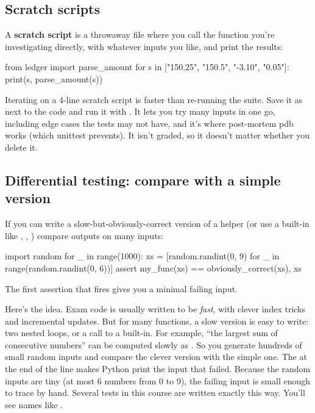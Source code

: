 \documentclass[10pt,a4paper]{article}
\begin{document}
\subsection{Scratch scripts}
A \textbf{scratch script} is a throwaway file where you call the function you’re investigating directly, with whatever inputs you like, and print the results:
\begin{pycode}
from ledger import parse_amount
for s in ["150.25", "150.5", "-3.10", "0.05"]:
    print(s, parse_amount(s))
\end{pycode}
Iterating on a 4-line scratch script is faster than re-running the suite.
Save it as  next to the code and run it with . It lets you try many inputs in one go, including edge cases the tests may not have, and it’s where post-mortem pdb works (which unittest prevents). It isn’t graded, so it doesn’t matter whether you delete it.
\subsection{Differential testing: compare with a simple version}
\begin{tipbox}
If you can write a slow-but-obviously-correct version of a helper (or use a built-in like , , ) compare outputs on many inputs:
\end{tipbox}
\begin{pycode}
import random
for _ in range(1000):
    xs = [random.randint(0, 9) for _ in range(random.randint(0, 6))]
    assert my_func(xs) == obviously_correct(xs), xs
\end{pycode}
\begin{keybox}
The first assertion that fires gives you a minimal failing input.
\end{keybox}
Here’s the idea. Exam code is usually written to be \emph{fast}, with clever index tricks and incremental updates. But for many functions, a slow version is easy to write: two nested loops, or a call to a built-in. For example, “the largest sum of  consecutive numbers” can be computed slowly as .
So you generate hundreds of small random inputs and compare the clever version with the simple one. The  at the end of the  line makes Python print the input that failed. Because the random inputs are tiny (at most 6 numbers from 0 to 9), the failing input is small enough to trace by hand. Several tests in this course are written exactly this way. You’ll see names like .
\setcounter{section}{5}
\end{document}

